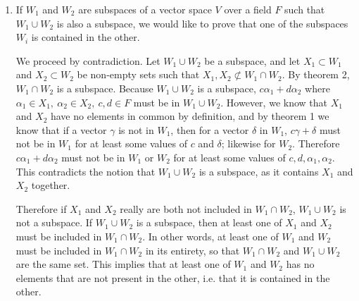 \documentclass[12pt]{article}
\begin{document}
\begin{enumerate}
    \item
      If $W_1$ and $W_2$ are subspaces of a vector space $V$ over a field $F$ such
      that $W_1 \cup W_2$ is also a subspace, we would like to prove that one of the
      subspaces $W_i$ is contained in the other.

      We proceed by contradiction. Let $W_1 \cup W_2$ be a subspace, and let $X_1
      \subset W_1$ and $X_2 \subset W_2$ be non-empty sets such that $X_1,X_2
      \not\subset W_1 \cap W_2$. By theorem 2, $W_1 \cap W_2$ is a subspace. Because
      $W_1 \cup W_2$ is a subspace, $c\alpha_1 + d\alpha_2$ where $\alpha_1 \in X_1,\
      \alpha_2 \in X_2,\ c,d \in F$ must be in $W_1 \cup W_2$. However, we know that
      $X_1$ and $X_2$ have no elements in common by definition, and by theorem 1 we
      know that if a vector $\gamma$ is not in $W_1$, then for a vector $\delta$ in
      $W_1$, $c\gamma + \delta$ must not be in $W_1$ for at least some values of $c$
      and $\delta$; likewise for $W_2$. Therefore $c\alpha_1 + d\alpha_2$ must not be
      in $W_1$ or $W_2$ for at least some values of $c,d,\alpha_1,\alpha_2$. This
      contradicts the notion that $W_1 \cup W_2$ is a subspace, as it contains $X_1$
      and $X_2$ together.

      Therefore if $X_1$ and $X_2$ really are both not included in $W_1 \cap W_2$,
      $W_1 \cup W_2$ is not a subspace. If $W_1 \cup W_2$ is a subspace, then at
      least one of $X_1$ and $X_2$ must be included in $W_1 \cap W_2$. In other
      words, at least one of $W_1$ and $W_2$ must be included in $W_1 \cap W_2$ in
      its entirety, so that $W_1 \cap W_2$ and $W_1 \cup W_2$ are the same set. This
      implies that at least one of $W_1$ and $W_2$ has no elements that are not
      present in the other, i.e. that it is contained in the other.

  \end{enumerate}
\end{document}
